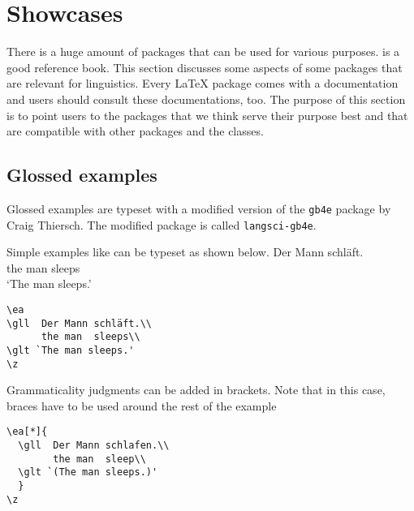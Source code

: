 \chapter{Showcases}

There is a huge amount of packages that can be used for various purposes. \citet{MG2013a} is a good
reference book. This section discusses some aspects of some packages that are relevant for
linguistics. Every \LaTeX\xspace package comes with a documentation and users should consult these
documentations, too. The purpose of this section is to point users to the packages that we think
serve their purpose best and that are compatible with other packages and the \lsp classes.

\section{Glossed examples}

Glossed examples are typeset with a modified version of the \texttt{gb4e} package by Craig
Thiersch. The modified package is called \texttt{langsci-gb4e}. 

Simple examples like  can be typeset as shown below.
\ea\label{ex:showcases:simple} 
\gll Der Mann schläft.\\
     the man  sleeps\\
\glt `The man sleeps.'
\z
\begin{verbatim}
\ea
\gll  Der Mann schläft.\\
      the man  sleeps\\
\glt `The man sleeps.'
\z
\end{verbatim}

Grammaticality judgments can be added in brackets. Note that in this case, braces have to be used around the rest of the example
\z
 
\newpage
\begin{verbatim}
\ea[*]{
  \gll  Der Mann schlafen.\\
        the man  sleep\\
  \glt `(The man sleeps.)'
  }
\z
\end{verbatim} 



